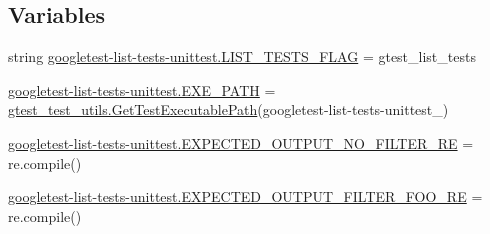 \subsection*{Variables}
\begin{DoxyCompactItemize}
\item 
string \mbox{\hyperlink{namespacegoogletest-list-tests-unittest_a0ed7b4792af42a3e286c09f42094659c}{googletest-\/list-\/tests-\/unittest.\+L\+I\+S\+T\+\_\+\+T\+E\+S\+T\+S\+\_\+\+F\+L\+AG}} = \textquotesingle{}gtest\+\_\+list\+\_\+tests\textquotesingle{}
\item 
\mbox{\hyperlink{namespacegoogletest-list-tests-unittest_add30c7a45a9cc216146c8b152e2c3455}{googletest-\/list-\/tests-\/unittest.\+E\+X\+E\+\_\+\+P\+A\+TH}} = \mbox{\hyperlink{namespacegtest__test__utils_a89ed3717984a80ffbb7a9c92f71b86a2}{gtest\+\_\+test\+\_\+utils.\+Get\+Test\+Executable\+Path}}(\textquotesingle{}googletest-\/list-\/tests-\/unittest\+\_\+\textquotesingle{})
\item 
\mbox{\hyperlink{namespacegoogletest-list-tests-unittest_abb2df597e07f0ba056b4a1d6109fd99f}{googletest-\/list-\/tests-\/unittest.\+E\+X\+P\+E\+C\+T\+E\+D\+\_\+\+O\+U\+T\+P\+U\+T\+\_\+\+N\+O\+\_\+\+F\+I\+L\+T\+E\+R\+\_\+\+RE}} = re.\+compile()
\item 
\mbox{\hyperlink{namespacegoogletest-list-tests-unittest_aede0392cd15434ad8392838a94c29c5e}{googletest-\/list-\/tests-\/unittest.\+E\+X\+P\+E\+C\+T\+E\+D\+\_\+\+O\+U\+T\+P\+U\+T\+\_\+\+F\+I\+L\+T\+E\+R\+\_\+\+F\+O\+O\+\_\+\+RE}} = re.\+compile()
\end{DoxyCompactItemize}
